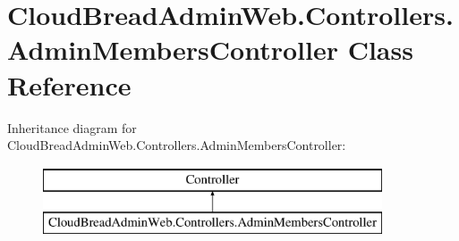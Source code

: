 \hypertarget{class_cloud_bread_admin_web_1_1_controllers_1_1_admin_members_controller}{}\section{Cloud\+Bread\+Admin\+Web.\+Controllers.\+Admin\+Members\+Controller Class Reference}
\label{class_cloud_bread_admin_web_1_1_controllers_1_1_admin_members_controller}
Inheritance diagram for Cloud\+Bread\+Admin\+Web.\+Controllers.\+Admin\+Members\+Controller\+:\begin{figure}[H]
\begin{center}
\leavevmode
\includegraphics[height=2.000000cm]{class_cloud_bread_admin_web_1_1_controllers_1_1_admin_members_controller}
\end{center}
\end{figure}
